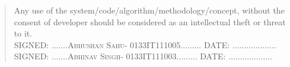 \begin{SingleSpace}
\begin{quote}
Any use of the system/code/algorithm/methodology/concept, without the consent of developer should be considered as an intellectual theft or threat to it.
\vspace{2cm} \\
\hspace{-0.75cm}\textsc{SIGNED: .......Abhushan Sahu- 0133IT111005......... DATE: ...................}
\vspace{0.1cm} 
\\

\textsc{SIGNED: .......Abhinav Singh- 0133IT111003......... DATE: ...................}
\end{quote}
\end{SingleSpace}
\clearpage 